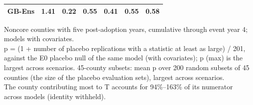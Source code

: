 \begin{table}
\begin{tabular*}{1\linewidth}{@{\extracolsep{\fill}}lrrrrrr}
GB-Ens & 1.41 & 0.22 & 0.55 & 0.41 & 0.55 & 0.58 \\ 
\bottomrule
\end{tabular*}
\begin{minipage}{\linewidth}
\vspace{.05em}
Noncore counties with five post-adoption years, cumulative through event year 4; models with covariates.\\
p = (1 + number of placebo replications with a statistic at least as large) / 201, against the E0 placebo null of the same model (with covariates); p (max) is the largest across scenarios. 45-county subsets: mean p over 200 random subsets of 45 counties (the size of the placebo evaluation sets), largest across scenarios.\\
The county contributing most to T accounts for 94\%–163\% of its numerator across models (identity withheld).\\
\end{minipage}
\end{table}

